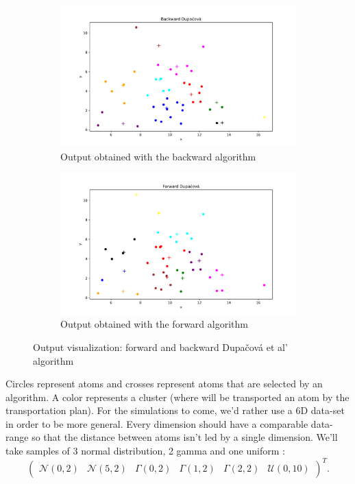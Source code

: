 \documentclass{amsart}
\begin{document}
\begin{figure}[ht]
    \centering
    \begin{subfigure}[b]{0.45\textwidth}
        \centering
        \includegraphics[width=\textwidth]{plots/dupacova backward.pdf}
        \caption{Output obtained with the backward algorithm}
        \label{result back}
    \end{subfigure}
    \hfill
    \begin{subfigure}[b]{0.45\textwidth}
        \centering
        \includegraphics[width=\textwidth]{plots/dupacova forward.pdf}
        \caption{Output obtained with the forward algorithm}
        \label{result forw}
    \end{subfigure}
    \caption{Output visualization: forward and backward Dupačová et al' algorithm}
\end{figure}

Circles represent atoms and crosses represent atoms that are selected by an algorithm. A color represents a cluster (where will be transported an atom by the transportation plan). For the simulations to come, we'd rather use a 6D data-set in order to be more general. Every dimension should have a comparable data-range so that the distance between atoms isn't led by a single dimension. We'll take samples of 3 normal distribution, 2 gamma and one uniform :
$$
\begin{pmatrix}
    \mathcal{N}\left(0,2\right) & \mathcal{N}\left(5,2\right) & \Gamma\left(0,2\right) & \Gamma\left(1,2\right) &\Gamma\left(2,2\right) & \mathcal{U}\left(0,10\right)
\end{pmatrix}^T.
$$
\end{document}
